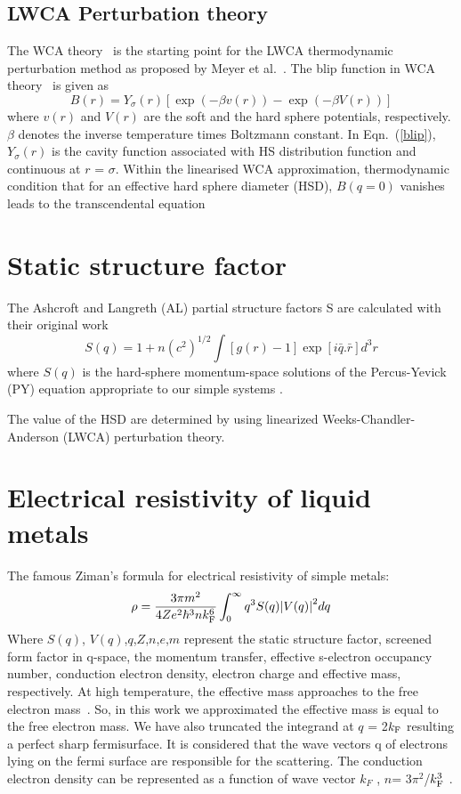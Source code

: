 \documentclass[final,12pt]{elsarticle}
\newcommand{\be}{\begin{equation}}
\newcommand{\ee}{\end{equation}}
\begin{document}
\subsection{LWCA Perturbation theory}
The WCA theory~\cite{Week1971} is the starting point for the LWCA thermodynamic perturbation method as proposed by Meyer et al.~\cite{Mayer1980}. The blip function in WCA theory~\cite{Week1971} is given as
\begin{equation}
\label{blip}
B(r)=Y_{\sigma}(r)[\exp(-\beta v(r))-\exp(-\beta V(r))]
\end{equation}
where $v(r)$ and $V(r)$ are the soft and the hard sphere potentials, respectively. $\beta$ denotes the inverse temperature times Boltzmann constant. In Eqn.~(\ref{blip}), $Y_{\sigma}(r)$ is the cavity function associated with HS distribution function and continuous at $r$ = $\sigma$. Within the linearised WCA approximation, thermodynamic condition that for an effective hard sphere diameter (HSD), $B(q = 0)$ vanishes leads to the transcendental equation
\section{Static structure factor}
The Ashcroft and Langreth (AL) partial structure factors S are calculated with their original work~\cite{LAshcroft1967} 
\begin{equation}
S(q)=1+n {(c^2)}^{1/2} \int[g(r)-1]\exp [i\bar q.\bar r]d^{3}r
\end{equation}
where $S(q)$ is the hard-sphere momentum-space solutions of the Percus-Yevick (PY) equation appropriate to our simple systems . 

 The value of the HSD are determined by using linearized Weeks-Chandler-Anderson (LWCA) perturbation theory. 
\
\section{Electrical resistivity of liquid metals}
The famous Ziman's formula for electrical resistivity of simple metals:
\be
\label{zn}
\rho=\frac{3\pi m^2}{4Ze^2\hbar^3 n k^6_{\rm F}} \int_{0}^{\infty} q^3S(q){\lvert{V(q)}\rvert}^{2} dq
\ee
Where $S(q)$, $V(q)$,$q$,$Z$,$n$,$e$,$m$ represent the static structure factor, screened form factor in q-space, the momentum transfer, effective s-electron occupancy number, conduction electron density, electron charge and effective mass, respectively. At high temperature, the effective mass approaches to the free electron mass~\cite{Baym1964}. So, in this work we approximated the effective mass is equal to the free electron mass. We have also truncated the integrand at $q$ = 2$k_{\rm F}$ resulting a perfect sharp fermisurface. It is considered that the wave vectors q of electrons lying on the fermi surface are responsible for the scattering. The conduction electron density can be represented as a function of wave vector $k_F$ , $n$= 3$\pi^2$/$k_{\rm F}^3$ .
\end{document}
